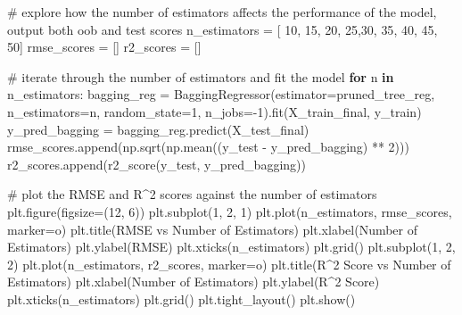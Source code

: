 \documentclass[
  letterpaper,
  DIV=11,
  numbers=noendperiod]{scrreprt}
\newenvironment{Shaded}{\begin{snugshade}}{\end{snugshade}}
\newcommand{\CommentTok}[1]{\textcolor[rgb]{0.37,0.37,0.37}{#1}}
\newcommand{\ControlFlowTok}[1]{\textcolor[rgb]{0.00,0.23,0.31}{\textbf{#1}}}
\newcommand{\DecValTok}[1]{\textcolor[rgb]{0.68,0.00,0.00}{#1}}
\newcommand{\KeywordTok}[1]{\textcolor[rgb]{0.00,0.23,0.31}{\textbf{#1}}}
\newcommand{\NormalTok}[1]{\textcolor[rgb]{0.00,0.23,0.31}{#1}}
\newcommand{\OperatorTok}[1]{\textcolor[rgb]{0.37,0.37,0.37}{#1}}
\newcommand{\StringTok}[1]{\textcolor[rgb]{0.13,0.47,0.30}{#1}}
\begin{document}
\begin{Shaded}
\begin{Highlighting}[]
\CommentTok{\# explore how the number of estimators affects the performance of the model, output both oob and test scores}
\NormalTok{n\_estimators }\OperatorTok{=}\NormalTok{ [ }\DecValTok{10}\NormalTok{, }\DecValTok{15}\NormalTok{, }\DecValTok{20}\NormalTok{, }\DecValTok{25}\NormalTok{,}\DecValTok{30}\NormalTok{, }\DecValTok{35}\NormalTok{, }\DecValTok{40}\NormalTok{, }\DecValTok{45}\NormalTok{, }\DecValTok{50}\NormalTok{]}
\NormalTok{rmse\_scores }\OperatorTok{=}\NormalTok{ []}
\NormalTok{r2\_scores }\OperatorTok{=}\NormalTok{ []}

\CommentTok{\# iterate through the number of estimators and fit the model}
\ControlFlowTok{for}\NormalTok{ n }\KeywordTok{in}\NormalTok{ n\_estimators:}
\NormalTok{    bagging\_reg }\OperatorTok{=}\NormalTok{ BaggingRegressor(estimator}\OperatorTok{=}\NormalTok{pruned\_tree\_reg, n\_estimators}\OperatorTok{=}\NormalTok{n, random\_state}\OperatorTok{=}\DecValTok{1}\NormalTok{,}
\NormalTok{                        n\_jobs}\OperatorTok{={-}}\DecValTok{1}\NormalTok{).fit(X\_train\_final, y\_train)}
\NormalTok{    y\_pred\_bagging }\OperatorTok{=}\NormalTok{ bagging\_reg.predict(X\_test\_final)}
\NormalTok{    rmse\_scores.append(np.sqrt(np.mean((y\_test }\OperatorTok{{-}}\NormalTok{ y\_pred\_bagging) }\OperatorTok{**} \DecValTok{2}\NormalTok{)))}
\NormalTok{    r2\_scores.append(r2\_score(y\_test, y\_pred\_bagging))}

\CommentTok{\# plot the RMSE and R\^{}2 scores against the number of estimators}
\NormalTok{plt.figure(figsize}\OperatorTok{=}\NormalTok{(}\DecValTok{12}\NormalTok{, }\DecValTok{6}\NormalTok{))}
\NormalTok{plt.subplot(}\DecValTok{1}\NormalTok{, }\DecValTok{2}\NormalTok{, }\DecValTok{1}\NormalTok{)}
\NormalTok{plt.plot(n\_estimators, rmse\_scores, marker}\OperatorTok{=}\StringTok{\textquotesingle{}o\textquotesingle{}}\NormalTok{)}
\NormalTok{plt.title(}\StringTok{\textquotesingle{}RMSE vs Number of Estimators\textquotesingle{}}\NormalTok{)}
\NormalTok{plt.xlabel(}\StringTok{\textquotesingle{}Number of Estimators\textquotesingle{}}\NormalTok{)}
\NormalTok{plt.ylabel(}\StringTok{\textquotesingle{}RMSE\textquotesingle{}}\NormalTok{)}
\NormalTok{plt.xticks(n\_estimators)}
\NormalTok{plt.grid()}
\NormalTok{plt.subplot(}\DecValTok{1}\NormalTok{, }\DecValTok{2}\NormalTok{, }\DecValTok{2}\NormalTok{)}
\NormalTok{plt.plot(n\_estimators, r2\_scores, marker}\OperatorTok{=}\StringTok{\textquotesingle{}o\textquotesingle{}}\NormalTok{)}
\NormalTok{plt.title(}\StringTok{\textquotesingle{}R\^{}2 Score vs Number of Estimators\textquotesingle{}}\NormalTok{)}
\NormalTok{plt.xlabel(}\StringTok{\textquotesingle{}Number of Estimators\textquotesingle{}}\NormalTok{)}
\NormalTok{plt.ylabel(}\StringTok{\textquotesingle{}R\^{}2 Score\textquotesingle{}}\NormalTok{)}
\NormalTok{plt.xticks(n\_estimators)}
\NormalTok{plt.grid()}
\NormalTok{plt.tight\_layout()}
\NormalTok{plt.show()}
\end{Highlighting}
\end{Shaded}
\end{document}
